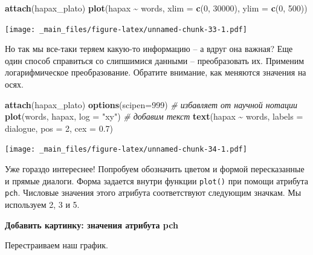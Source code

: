 \documentclass[
]{book}
\newenvironment{Shaded}{\begin{snugshade}}{\end{snugshade}}
\newcommand{\AttributeTok}[1]{\textcolor[rgb]{0.13,0.29,0.53}{#1}}
\newcommand{\CommentTok}[1]{\textcolor[rgb]{0.56,0.35,0.01}{\textit{#1}}}
\newcommand{\DecValTok}[1]{\textcolor[rgb]{0.00,0.00,0.81}{#1}}
\newcommand{\FloatTok}[1]{\textcolor[rgb]{0.00,0.00,0.81}{#1}}
\newcommand{\FunctionTok}[1]{\textcolor[rgb]{0.13,0.29,0.53}{\textbf{#1}}}
\newcommand{\NormalTok}[1]{#1}
\newcommand{\SpecialCharTok}[1]{\textcolor[rgb]{0.81,0.36,0.00}{\textbf{#1}}}
\newcommand{\StringTok}[1]{\textcolor[rgb]{0.31,0.60,0.02}{#1}}
\theoremstyle{definition}
\theoremstyle{definition}
\theoremstyle{definition}
\theoremstyle{definition}
\theoremstyle{remark}
\begin{document}
\begin{Shaded}
\begin{Highlighting}[]
\FunctionTok{attach}\NormalTok{(hapax\_plato) }
\FunctionTok{plot}\NormalTok{(hapax }\SpecialCharTok{\textasciitilde{}}\NormalTok{ words, }\AttributeTok{xlim =} \FunctionTok{c}\NormalTok{(}\DecValTok{0}\NormalTok{, }\DecValTok{30000}\NormalTok{), }\AttributeTok{ylim =} \FunctionTok{c}\NormalTok{(}\DecValTok{0}\NormalTok{, }\DecValTok{500}\NormalTok{))  }
\end{Highlighting}
\end{Shaded}

\texttt{[image: \_main\_files/figure-latex/unnamed-chunk-33-1.pdf]}

Но так мы все-таки теряем какую-то информацию -- а вдруг она важная? Еще один способ справиться со слипшимися данными -- преобразовать их. Применим логарифмическое преобразование. Обратите внимание, как меняются значения на осях.

\begin{Shaded}
\begin{Highlighting}[]
\FunctionTok{attach}\NormalTok{(hapax\_plato)}
\FunctionTok{options}\NormalTok{(}\AttributeTok{scipen=}\DecValTok{999}\NormalTok{) }\CommentTok{\# избавляет от научной нотации}
\FunctionTok{plot}\NormalTok{(words, hapax, }\AttributeTok{log =} \StringTok{"xy"}\NormalTok{)  }
\CommentTok{\# добавим текст}
\FunctionTok{text}\NormalTok{(hapax }\SpecialCharTok{\textasciitilde{}}\NormalTok{ words, }\AttributeTok{labels =}\NormalTok{ dialogue, }\AttributeTok{pos =} \DecValTok{2}\NormalTok{, }\AttributeTok{cex =} \FloatTok{0.7}\NormalTok{)}
\end{Highlighting}
\end{Shaded}

\texttt{[image: \_main\_files/figure-latex/unnamed-chunk-34-1.pdf]}

Уже гораздо интереснее! Попробуем обозначить цветом и формой пересказанные и прямые диалоги. Форма задается внутри функции \texttt{plot()} при помощи атрибута \texttt{pch}. Числовые значения этого атрибута соответствуют следующим значкам. Мы используем 2, 3 и 5.

\textbf{Добавить картинку: значения атрибута pch}

Перестраиваем наш график.
\end{document}
